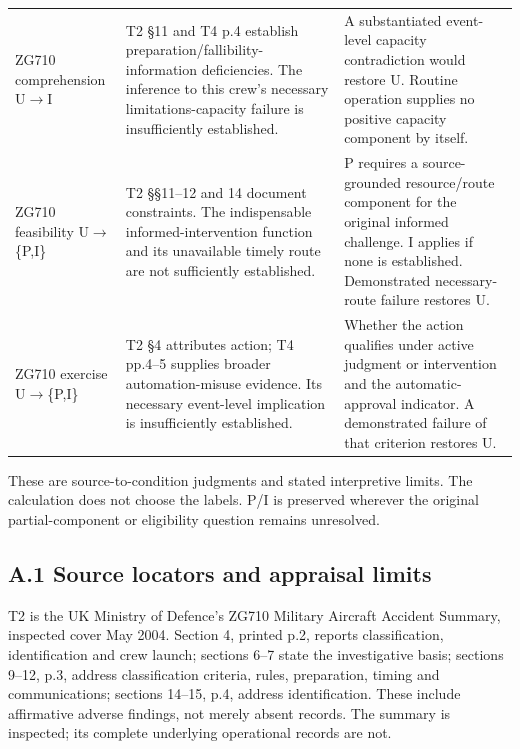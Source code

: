 \documentclass[11pt]{article}
\newlength{\TAETableWidth}
\begin{document}
\begin{longtable}{@{}>{\raggedright\arraybackslash}p{0.230\TAETableWidth}>{\raggedright\arraybackslash}p{0.400\TAETableWidth}>{\raggedright\arraybackslash}p{0.370\TAETableWidth}@{}}
ZG710 comprehension U\(\rightarrow\)I & T2 §11 and T4 p.4 establish preparation/fallibility-information deficiencies. The inference to this crew’s necessary limitations-capacity failure is insufficiently established. & A substantiated event-level capacity contradiction would restore U. Routine operation supplies no positive capacity component by itself. \\
ZG710 feasibility U\(\rightarrow\)\{P,I\} & T2 §§11--12 and 14 document constraints. The indispensable informed-intervention function and its unavailable timely route are not sufficiently established. & P requires a source-grounded resource/route component for the original informed challenge. I applies if none is established. Demonstrated necessary-route failure restores U. \\
ZG710 exercise U\(\rightarrow\)\{P,I\} & T2 §4 attributes action; T4 pp.4--5 supplies broader automation-misuse evidence. Its necessary event-level implication is insufficiently established. & Whether the action qualifies under active judgment or intervention and the automatic-approval indicator. A demonstrated failure of that criterion restores U. \\
\end{longtable}
\endgroup
{\footnotesize\raggedright These are source-to-condition judgments and stated interpretive limits. The calculation does not choose the labels. P/I is preserved wherever the original partial-component or eligibility question remains unresolved.\par}
\medskip

\subsection*{A.1 Source locators and appraisal limits}

T2 is the UK Ministry of Defence's ZG710 Military Aircraft Accident Summary, inspected cover May 2004. Section 4, printed p.2, reports classification, identification and crew launch; sections 6--7 state the investigative basis; sections 9--12, p.3, address classification criteria, rules, preparation, timing and communications; sections 14--15, p.4, address identification. These include affirmative adverse findings, not merely absent records. The summary is inspected; its complete underlying operational records are not.
\end{document}
